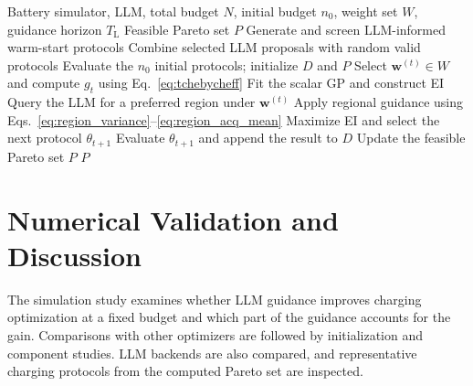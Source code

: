\documentclass[lettersize,journal]{IEEEtran}
\begin{document}
\begin{algorithm}[t]
\caption{LLMBO-MO}
\label{alg:llmbo}
\footnotesize
\begin{algorithmic}[1]
\Require Battery simulator, LLM, total budget $N$, initial budget $n_0$, weight set $W$, guidance horizon $T_{\mathrm L}$
\Ensure Feasible Pareto set $P$
\State Generate and screen LLM-informed warm-start protocols
\State Combine selected LLM proposals with random valid protocols
\State Evaluate the $n_0$ initial protocols; initialize $D$ and $P$
    \State Select $\mathbf w^{(t)}\in W$ and compute $g_t$ using Eq.~\eqref{eq:tchebycheff}
    \State Fit the scalar GP and construct EI
        \State Query the LLM for a preferred region under $\mathbf w^{(t)}$
            \State Apply regional guidance using Eqs.~\eqref{eq:region_variance}--\eqref{eq:region_acq_mean}
        \EndIf
    \EndIf
    \State Maximize EI and select the next protocol $\theta_{t+1}$
    \State Evaluate $\theta_{t+1}$ and append the result to $D$
    \State Update the feasible Pareto set $P$
\EndFor
\State \Return $P$
\end{algorithmic}
\end{algorithm}
\section{Numerical Validation and Discussion}
\label{sec:experiments}

The simulation study examines whether LLM guidance improves charging
optimization at a fixed budget and which part of the guidance accounts for the
gain. Comparisons with other optimizers are followed by initialization and
component studies. LLM backends are also compared, and representative
charging protocols from the computed Pareto set are inspected.
\end{document}
